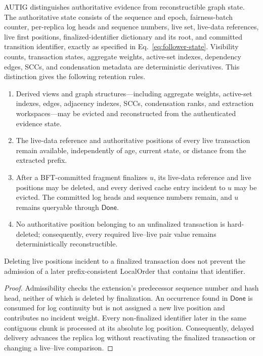 AUTIG distinguishes authoritative evidence from reconstructible graph state.
The authoritative state consists of the sequence and epoch, fairness-batch
counter, per-replica log heads and sequence numbers, live set, live-data
references, live first positions, finalized-identifier dictionary and its
root, and committed transition identifier, exactly as specified in
Eq.~\eqref{eq:follower-state}.
Visibility counts, transaction
states, aggregate weights, active-set indexes, dependency edges, SCCs, and
condensation metadata are deterministic derivatives.  This distinction gives
the following retention rules.

\begin{enumerate}
  \item Derived views and graph structures---including aggregate weights,
        active-set indexes, edges, adjacency indexes, SCCs, condensation
        ranks, and extraction workspaces---may be evicted and reconstructed
        from the authenticated evidence state.
  \item The live-data reference and authoritative positions of every live
        transaction remain available, independently of age, current state, or
        distance from the extracted prefix.
  \item After a BFT-committed fragment finalizes $u$, its live-data reference
        and live positions may be deleted, and every derived cache entry
        incident to $u$ may be evicted.  The committed log heads and sequence
        numbers remain, and $u$ remains queryable through $\mathsf{Done}$.
  \item No authoritative position belonging to an unfinalized transaction is
        hard-deleted; consequently, every required live--live pair value
        remains deterministically reconstructible.
\end{enumerate}

\begin{lemma}
\label{lem:delayed-extension-compatibility}
Deleting live positions incident to a finalized transaction does not prevent
the admission of a later prefix-consistent LocalOrder that contains that
identifier.
\end{lemma}

\begin{proof}
Admissibility checks the extension's predecessor sequence number and hash head,
neither of which is deleted by finalization.  An occurrence found in
$\mathsf{Done}$ is consumed for log continuity but is not assigned a new live
position and contributes no incident weight.  Every non-finalized identifier
later in the same contiguous chunk is processed at its absolute log position.
Consequently, delayed delivery advances the replica log without reactivating
the finalized transaction or changing a live--live comparison.
\end{proof}

